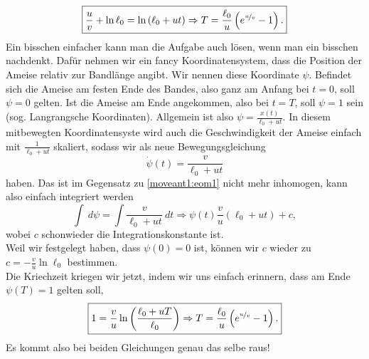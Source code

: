 \begin{Answer}[ref = moveant]
	\begin{equation}\label{moveant1:eom1sol}
	\boxed{
		\frac{u}{v} + \ln \ell_0 = \ln\left(\ell_0 + u t\right) \Rightarrow T = \frac{\ell_0}{u}\left(e^{\nicefrac{u}{v}}-1\right).}
	\end{equation}
	Ein bisschen einfacher kann man die Aufgabe auch lösen, wenn man ein bisschen nachdenkt. Dafür nehmen wir ein fancy Koordinatensystem, dass die Position der Ameise relativ zur Bandlänge angibt. Wir nennen diese Koordinate $\psi$. Befindet sich die Ameise am festen Ende des Bandes, also ganz am Anfang bei $t=0$, soll $\psi = 0$ gelten. Ist die Ameise am Ende angekommen, also bei $t=T$, soll $\psi  = 1$ sein (sog. Langrangsche Koordinaten). Allgemein ist also $\psi = \frac{x\left(t\right)}{\ell_0 + ut}$. In diesem mitbewegten Koordinatensyste wird auch die Geschwindigkeit der Ameise einfach mit $\frac{1}{\ell_0 + ut}$ skaliert, sodass wir als neue Bewegungsgleichung
	\begin{equation}\label{moveant1:eom2}
		\dot{\psi}\left(t\right) = \frac{v}{\ell_0 + ut}
	\end{equation}
	haben. Das ist im Gegensatz zu \eqref{moveant1:eom1} nicht mehr inhomogen, kann also einfach integriert werden
	\begin{equation*}
		\int~d\psi  = \int \frac{v}{\ell_0 + u t}~dt \Rightarrow \psi\left(t\right) \frac{v}{u}\left(\ell_0 + ut\right) + c,
	\end{equation*}
	wobei $c$ schonwieder die Integrationskonstante ist.\\
	Weil wir festgelegt haben, dass $\psi\left(0\right) = 0$ ist, können wir $c$ wieder zu $c = -\frac{v}{u}\ln \ell_0$ bestimmen.\\
	Die Kriechzeit kriegen wir jetzt, indem wir uns einfach erinnern, dass am Ende $\psi\left(T\right) = 1$ gelten soll,
	\begin{equation}\label{moveant1:eom2sol}
	\boxed{
		1 = \frac{v}{u}\ln\left(\frac{\ell_0 + u T}{\ell_0}\right) \Rightarrow T = \frac{\ell_0}{u}\left(e^{\nicefrac{u}{v}}-1\right).} 
	\end{equation}
	Es kommt also bei beiden Gleichungen genau das selbe raus!
\end{Answer}